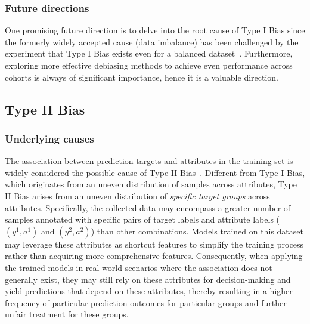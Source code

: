 \subsubsection{Future directions}
One promising future direction is to delve into the root cause of Type I Bias since the formerly widely accepted cause (data imbalance) has been challenged by the experiment that Type I Bias exists even for a balanced dataset~\cite{RL_RBN}.
Furthermore, exploring more effective debiasing methods to achieve even performance across cohorts is always of significant importance, hence it is a valuable direction.





















\subsection{Type II Bias}

\subsubsection{Underlying causes}
The association between prediction targets and attributes in the training set is widely considered the possible cause of Type II Bias~\cite{LfF_CelebA_Bias_conflicting,CSAD,ECS}. 
Different from Type I Bias, which originates from an uneven distribution of samples across attributes, Type II Bias arises from an uneven distribution of \emph{specific target groups} across attributes. 
Specifically, the collected data may encompass a greater number of samples annotated with specific pairs of target labels and attribute labels (\eg $(y^1,a^1)$ and $(y^2,a^2)$) than other combinations. 
Models trained on this dataset may leverage these attributes as shortcut features to simplify the training process rather than acquiring more comprehensive features. 
Consequently, when applying the trained models in real-world scenarios where the association does not generally exist, they may still rely on these attributes for decision-making and yield predictions that depend on these attributes, thereby resulting in a higher frequency of particular prediction outcomes for particular groups and further unfair treatment for these groups.








